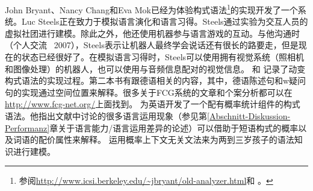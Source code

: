 John Bryant、Nancy Chang和Eva Mok已经为体验构式语法\footnote{%
  参阅\url{http://www.icsi.berkeley.edu/~jbryant/old-analyzer.html}和 。
}的实现开发了一个系统。Luc Steels正在致力于模拟语言演化和语言习得\citep{Steels2003a}。Steels通过实验为交互人员的虚拟社团进行建模。除此之外，他还使用机器参与语言游戏的互动\citep{Steels2015a-u}。与他沟通时（个人交流 \, 2007），Steels表示让机器人最终学会说话还有很长的路要走，但是现在的状态已经很好了。在模拟语言习得时，Steels可以使用拥有视觉系统（照相机和图像处理）的机器人，也可以使用与音频信息配对的视觉信息。 和 记录了动变构式语法的实现过程。第二本书有跟德语相关的内容，其中，德语陈述句和w疑问句的实现通过空间位置来解释\citep{Micelli2012a}。很多关于FCG系统的文章和个案分析都可以在\url{http://www.fcg-net.org/}上面找到。 \citet{Jurafsky96a}为英语开发了一个配有概率统计组件的构式语法。他指出文献中讨论的很多语言运用现象（参见第\ref{Abschnitt-Diskussion-Performanz}章关于语言能力/语言运用差异的论述）可以借助于短语构式的概率以及词语的配价属性来解释。 \citet*{BLT2009a}运用概率上下文无关文法来为两到三岁孩子的语法知识进行建模。

